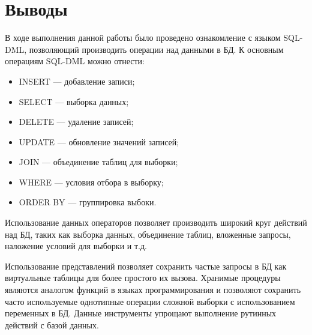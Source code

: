 \section{Выводы}

В ходе выполнения данной работы было проведено ознакомление с языком SQL-DML, позволяющий производить операции над данными в БД. К основным операциям SQL-DML можно отнести:

\begin{itemize}
 	\item INSERT --- добавление записи;
 	\item SELECT --- выборка данных;
 	\item DELETE --- удаление записей;
 	\item UPDATE --- обновление значений записей;
 	\item JOIN --- объединение таблиц для выборки;
 	\item WHERE --- условия отбора в выборку;
 	\item ORDER BY --- группировка выбоки.
 \end{itemize} 

Использование данных операторов позволяет производить широкий круг действий над БД, таких как выборка данных, объединение таблиц, вложенные запросы, наложение условий для выборки и т.д. 

Использование представлений позволяет сохранить частые запросы в БД как виртуальные таблицы для более простого их вызова. Хранимые процедуры являются аналогом функций в языках программирования и позволяют сохранить часто используемые однотипные операции сложной выборки с использованием переменных в БД. Данные инструменты упрощают выполнение рутинных действий с базой данных.